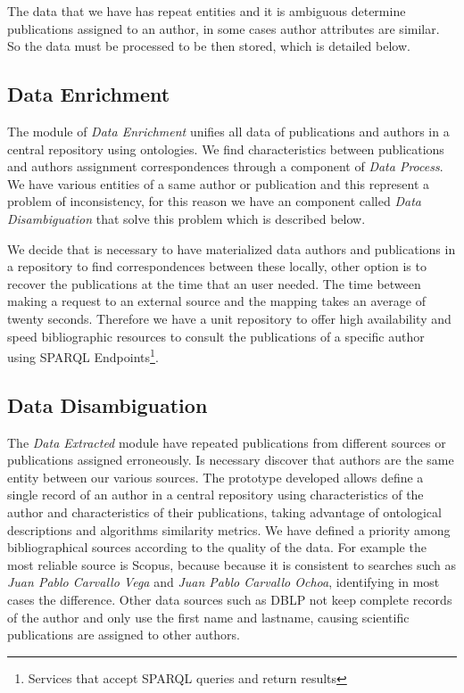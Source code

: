\documentclass[11pt]{article}
\begin{document}
The data that we have has repeat entities and it is  ambiguous  determine  publications assigned to an author, in some cases author attributes are similar. So the data must be processed to be then stored, which is detailed below.
\subsection{Data Enrichment}

The module of \emph{Data Enrichment} unifies all data of publications and authors in a central repository using ontologies. We find characteristics between publications and authors assignment correspondences through a component of \emph{Data Process}. We have various entities of a same author or publication and this represent a problem of inconsistency, for this reason we have an component called \emph{Data Disambiguation} that solve this problem which is described below.

We decide that is necessary to have materialized data authors and publications in a repository to find correspondences between these locally, other option is to recover the publications at the time that an user needed. The time between making a request to an external source and the mapping takes an average of twenty seconds. Therefore we have a unit repository  to offer high availability and speed bibliographic resources to consult the publications of a specific author using SPARQL Endpoints\footnote{Services that accept SPARQL queries and return results}.

\subsection{Data Disambiguation}

The \emph{Data Extracted} module have repeated publications from different sources or publications assigned erroneously. Is necessary discover that authors are the same entity between our various sources. The prototype developed allows  define a single record of an author in a central repository using characteristics of the author and characteristics of their publications, taking advantage of ontological descriptions and algorithms similarity metrics. We have defined a priority among bibliographical sources according to the quality of the data. For example the most reliable source is Scopus, because
because it is consistent to searches such as   \textit{Juan Pablo Carvallo Vega} and \textit{Juan Pablo Carvallo Ochoa}, identifying in most cases the difference. Other data sources such as DBLP not keep complete records of the author and only use the first name and lastname, causing scientific publications are assigned to other authors.
\end{document}
